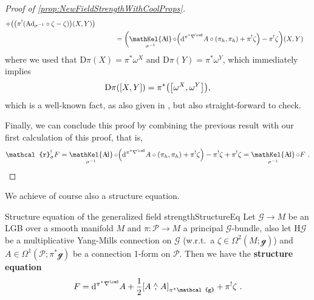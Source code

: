 \documentclass[reqno,a4paper,oneside]{amsart}
\theoremstyle{plain}
\theoremstyle{remark}
\theoremstyle{definition}
\DeclareMathOperator{\sAd}{\mathKel{A\mkern-5.5mu d}}
\begin{document}
\begin{proof}[Proof of \ref{prop:NewFieldStrengthWithCoolProps}]
\begin{align*}
	+ \mleft(\mleft(\pi^!\mleft(  
		\mathrm{Ad}_{\sigma^{-1}} \circ \zeta 
		- \zeta 
	\mright)\mright)(X, Y) \mright)
\\&\hspace{1cm}
=
\mleft(
	\sAd_{\sigma^{-1}}\circ \mleft( \mathrm{d}^{\pi^*\nabla^\caG}A \circ ( \pi_h, \pi_h) + \pi^!\zeta \mright) 
		- \pi^!\zeta 
\mright)(X, Y)
\end{align*}
where we used that $\mathrm{D}\pi (X) = \pi^*\omega^X$ and $\mathrm{D}\pi (Y) = \pi^*\omega^Y$, which immediately implies
\begin{equation*}
\mathrm{D}\pi\mleft( [X, Y] \mright)
=
\pi^*\mleft( \mleft[\omega^X, \omega^Y\mright] \mright),
\end{equation*}
which is a well-known fact, as also given in \cite[Proposition A.1.49; page 615]{Hamilton}, but also straight-forward to check. 

Finally, we can conclude this proof by combining the previous result with our first calculation of this proof, that is,
\begin{equation*}
\mathcal{r}_{\sigma}^!F
=
\sAd_{\sigma^{-1}}\circ \mleft( \mathrm{d}^{\pi^*\nabla^\caG}A \circ ( \pi_h, \pi_h) + \pi^!\zeta \mright) 
		- \pi^!\zeta
		+ \pi^!\zeta
=
\sAd_{\sigma^{-1}} \circ F~.
\end{equation*}
\end{proof}

We achieve of course also a structure equation.

\begin{propositions}{Structure equation of the generalized field strength}{StructureEq}
Let $\mathcal{G} \to M$ be an LGB over a smooth manifold $M$ and $\pi\colon\mathcal{P} \to M$ a principal $\mathcal{G}$-bundle, also let $\mathrm{H}\mathcal{G}$ be a multiplicative Yang-Mills connection on $\mathcal{G}$ (w.r.t.\ a $\zeta \in \Omega^2(M; \mathcal{g})$) and $A \in \Omega^1(\mathcal{P}; \pi^*\mathcal{g})$ be a connection 1-form on $\mathcal{P}$. Then we have the \textbf{structure equation}
\begin{equation*}
F
=
\mathrm{d}^{\pi^*\nabla^\caG} A
	+ \frac{1}{2} \mleft[ A \stackrel{\wedge}{,} A \mright]_{\pi^*\mathcal{g}}
	+ \pi^!\zeta~.
\end{equation*}
\end{propositions}
\end{document}
